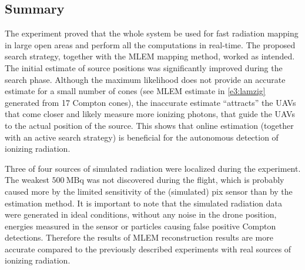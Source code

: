 \subsection{Summary}
The experiment proved that the whole system be used for fast radiation mapping in large open areas and perform all the computations in real-time.
The proposed search strategy, together with the \ac{MLEM} mapping method, worked as intended.
The initial estimate of source positions was significantly improved during the search phase.
Although the maximum likelihood does not provide an accurate estimate for a small number of cones (see \ac{MLEM} estimate in \autoref{e3:lamzig} generated from 17 Compton cones), the inaccurate estimate ``attracts'' the \ac{UAV}s that come closer and likely measure more ionizing photons, that guide the \ac{UAV}s to the actual position of the source.
This shows that online estimation (together with an active search strategy) is beneficial for the autonomous detection of ionizing radiation.

Three of four sources of simulated radiation were localized during the experiment.
The weakest $\SI{500}{\mega\becquerel}$ was not discovered during the flight, which is probably caused more by the limited sensitivity of the (simulated) \ac{pix} sensor than by the estimation method. It is important to note that the simulated radiation data were generated in ideal conditions, without any noise in the drone position, energies measured in the sensor or particles causing false positive Compton detections.
Therefore the results of \ac{MLEM} reconstruction results are more accurate compared to the previously described experiments with real sources of ionizing radiation.


